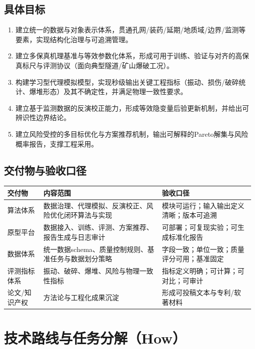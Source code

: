 \documentclass[12pt,a4paper,fontset=mac]{ctexart}
\begin{document}
\subsection{具体目标}
\begin{enumerate}
  \item 建立统一的数据与对象表示体系，贯通孔网/装药/延期/地质域/边界/监测等要素，实现结构化治理与可追溯管理。
  \item 建立多保真机理基准与等效参数化体系，形成可用于训练、验证与对齐的高保真标尺与评测协议（面向典型隧道/矿山爆破工况）。
  \item 构建学习型代理模拟模型，实现秒级输出关键工程指标（振动、损伤/破碎统计、爆堆形态）及其不确定性，并满足物理一致性要求。
  \item 建立基于监测数据的反演校正能力，形成等效隐变量后验更新机制，并给出可辨识性边界结论。
  \item 建立风险受控的多目标优化与方案推荐机制，输出可解释的Pareto解集与风险概率报告，支撑工程采用。
\end{enumerate}

\subsection{交付物与验收口径}
\begin{table}[h]
\centering
\renewcommand{\arraystretch}{1.25}
\begin{tabularx}{\linewidth}{p{2.8cm}X p{4.3cm}}
\toprule
\textbf{交付物} & \textbf{内容范围} & \textbf{验收口径} \\
\midrule
算法体系 & 数据治理、代理模拟、反演校正、风险优化闭环算法与实现 & 模块可运行；输入输出定义清晰；版本可追溯 \\
原型平台 & 数据接入、训练、评测、方案推荐、报告生成与日志审计 & 可部署；可复现实验；可生成标准化报告 \\
数据体系 & 统一数据schema、质量控制规则、基准任务与数据划分策略 & 字段一致；单位一致；质量评分可用；基准固定 \\
评测指标体系 & 振动、破碎、爆堆、风险与物理一致性指标 & 指标定义明确；可计算；可对比；可审计 \\
论文/知识产权 & 方法论与工程化成果沉淀 & 形成可投稿文本与专利/软著材料 \\
\bottomrule
\end{tabularx}
\end{table}

\section{技术路线与任务分解（How）}
\end{document}
